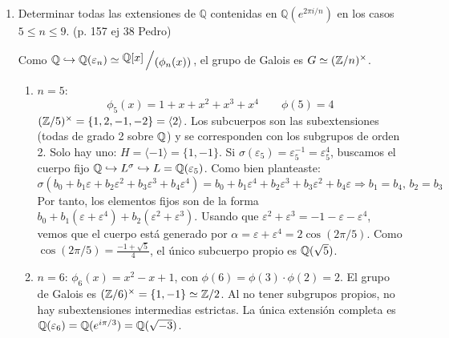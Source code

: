 \begin{enumerate}
\begin{dem}
\underline{El número de elementos en $\mathbb{F}_{p^8}$ que no están en $\mathbb{F}_{p^4}$ es}:
\[ |\mathbb{F}_{p^8} \setminus \mathbb{F}_{p^4}| = p^8 - p^4 \]

Finalmente, como cada polinomio mínimo de grado 8 tiene 8 raíces en $\mathbb{F}_{p^8}$, dividimos entre el grado de la extensión para obtener la cantidad de polinomios mónicos irreducibles:
\[ N_8 = \frac{|\mathbb{F}_{p^8} \setminus \mathbb{F}_{p^4}|}{8} = \frac{p^8 - p^4}{8} \]
    \end{dem}    
    \item Determinar todas las extensiones de $\mathbb{Q}$ contenidas en $\mathbb{Q}(e^{2\pi i/n})$ en los casos $5 \le n \le 9$.  (p. 157 ej 38 Pedro)
    \begin{dem}
    Como $\bb Q \hookrightarrow \bb Q(\varepsilon_n) \simeq \modulo{\bb Q[x]}{(\phi_n(x))}$, el grupo de Galois es $G \simeq (\mathbb{Z}/n)^{\times}$. 
    
    \begin{enumerate}
        \item \textbf{$n=5$}:
        $$\phi_5(x) = 1+x+x^2+x^3+x^4 \qquad \phi(5)=4$$
        $(\mathbb{Z}/5)^{\times} = \{1,2,-1,-2\} = \langle 2\rangle$. Los subcuerpos son las subextensiones (todas de grado 2 sobre $\mathbb{Q}$) y se corresponden con los subgrupos de orden 2. Solo hay uno: $H = \langle -1 \rangle = \{1, -1\}$. 
        Si $\sigma(\varepsilon_5) = \varepsilon^{-1}_5 = \varepsilon_5^4$, buscamos el cuerpo fijo $\mathbb{Q} \hookrightarrow L^{\sigma} \hookrightarrow L=\mathbb{Q}(\varepsilon_5)$. 
        Como bien planteaste:
        $$\sigma(b_0 + b_1\varepsilon + b_2\varepsilon^2+b_3\varepsilon^3 + b_4 \varepsilon^4) = b_0 + b_1 \varepsilon^4 + b_2 \varepsilon^{3} + b_3 \varepsilon^{2} + b_4 \varepsilon \Rightarrow b_1=b_4, \, b_2=b_3$$
        Por tanto, los elementos fijos son de la forma $b_0 + b_1(\varepsilon + \varepsilon^4) + b_2(\varepsilon^2 + \varepsilon^3)$. Usando que $\varepsilon^2+\varepsilon^3 = -1 - \varepsilon - \varepsilon^4$, vemos que el cuerpo está generado por $\alpha = \varepsilon + \varepsilon^4 = 2\cos(2\pi/5)$. Como $\cos(2\pi/5) = \frac{-1+\sqrt{5}}{4}$, el único subcuerpo propio es $\mathbb{Q}(\sqrt{5})$.

        \item \textbf{$n=6$}: 
        $\phi_6(x) = x^2-x+1$, con $\phi(6) = \phi(3)\cdot \phi(2) = 2$.
        El grupo de Galois es $(\mathbb{Z}/6)^{\times} = \{1, -1\} \simeq \mathbb{Z}/2$. Al no tener subgrupos propios, no hay subextensiones intermedias estrictas. La única extensión completa es $\mathbb{Q}(\varepsilon_6) = \mathbb{Q}(e^{i\pi/3}) = \mathbb{Q}(\sqrt{-3})$.


\end{enumerate}
\end{dem}
\end{enumerate}
